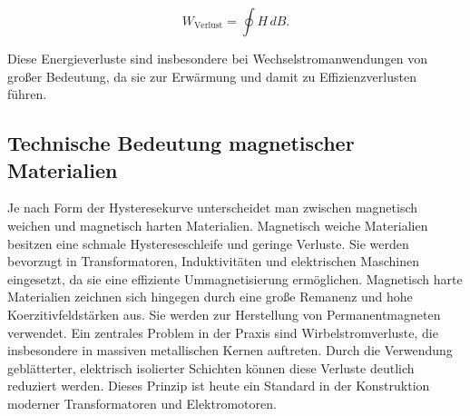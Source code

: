 \begin{equation}
W_{\text{Verlust}} = \oint H \, dB.
\end{equation}

\noindent Diese Energieverluste sind insbesondere bei Wechselstromanwendungen von großer Bedeutung, da sie zur Erwärmung und damit zu Effizienzverlusten führen.~\cite[S. 920 ff.]{Tipler}

\subsection{Technische Bedeutung magnetischer Materialien}

Je nach Form der Hysteresekurve unterscheidet man zwischen magnetisch weichen und magnetisch harten Materialien. Magnetisch weiche Materialien besitzen eine schmale Hystereseschleife und geringe Verluste. Sie werden bevorzugt in Transformatoren, Induktivitäten und elektrischen Maschinen eingesetzt, da sie eine effiziente Ummagnetisierung ermöglichen. 
Magnetisch harte Materialien zeichnen sich hingegen durch eine große Remanenz und hohe Koerzitivfeldstärken aus. Sie werden zur Herstellung von Permanentmagneten verwendet. Ein zentrales Problem in der Praxis sind Wirbelstromverluste, die insbesondere in massiven metallischen Kernen auftreten. 
Durch die Verwendung geblätterter, elektrisch isolierter Schichten können diese Verluste deutlich reduziert werden. Dieses Prinzip ist heute ein Standard in der Konstruktion moderner Transformatoren und Elektromotoren. ~\cite[S. 923 ff.]{Tipler}
\newpage
